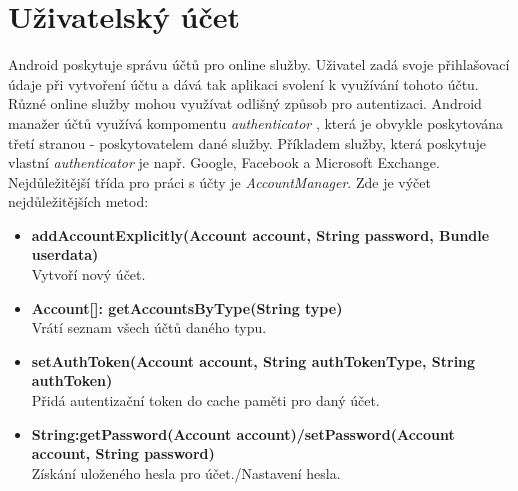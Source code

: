 \documentclass{diplomka}
\begin{document}
\section{Uživatelský účet}
Android poskytuje správu účtů pro online služby. Uživatel zadá svoje přihlašovací údaje při vytvoření účtu a dává tak aplikaci svolení k využívání tohoto účtu.\\ \indent
Různé online služby mohou využívat odlišný způsob pro autentizaci. Android manažer účtů využívá kompomentu \emph{authenticator} \cite{accman}, která je obvykle poskytována třetí stranou - poskytovatelem dané služby. Příkladem služby, která poskytuje vlastní \emph{authenticator} je např. Google, Facebook a Microsoft Exchange.\\ \indent
Nejdůležitější třída pro práci s účty je \emph{AccountManager}. Zde je výčet nejdůležitějších metod:
\begin{itemize}[]
\item \textbf{addAccountExplicitly(Account account, String password, Bundle userdata)}\\
Vytvoří nový účet.
\item \textbf{Account[]: getAccountsByType(String type)}\\
Vrátí seznam všech účtů daného typu.
\item \textbf{setAuthToken(Account account, String authTokenType, String authToken)}\\
Přidá autentizační token do cache paměti pro daný účet.
\item \textbf{String:getPassword(Account account)/setPassword(Account account, String password)}\\
Získání uloženého hesla pro účet./Nastavení hesla.
\end{itemize}
\end{document}
